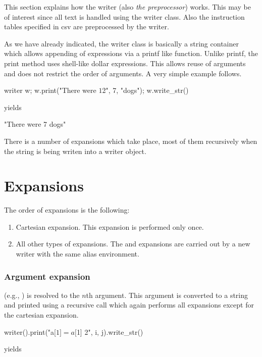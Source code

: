 This section explains how the writer (also \emph{the preprocessor}) works. This may be of interest since all text is handled using the writer class. Also the instruction tables specified in csv are preprocessed by the writer.

As we have already indicated, the writer class is basically a string container which allows appending of expressions via a printf like function. Unlike printf, the print method uses shell-like dollar expressions. This allows reuse of arguments and does not restrict the order of arguments. A very simple example follows.

\mybeginfig
\begin{code}
writer w;
w.print("There were $1 $2", 7, "dogs");
w.write_str()
\end{code}
yields
\begin{code}
"There were 7 dogs"
\end{code}

There is a number of expansions which take place, most of them recursively when the string is being writen into a writer object.

\section*{Expansions}

The order of expansions is the following:
\begin{enumerate}
\item Cartesian expansion. This expansion is performed only once.
\item All other types of expansions. The \ttt{\$\string{\string}} and \ttt{\$[]} expansions are carried out by a new writer with the same alias environment.
\end{enumerate}

\subsubsection{Argument expansion}

 (e.g., ) is resolved to the $n$th argument. This argument is converted to a string and printed using a recursive call which again performs all expansions except for the cartesian expansion.

\mybeginfig
\begin{code}
writer().print("a[$1] = a[$1] $ $2", i, j).write_str()
\end{code}
yields

